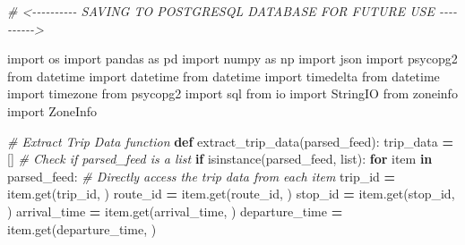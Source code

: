 \documentclass[
  12pt,
]{article}
\newenvironment{Shaded}{\begin{snugshade}}{\end{snugshade}}
\newcommand{\BuiltInTok}[1]{#1}
\newcommand{\CommentTok}[1]{\textcolor[rgb]{0.56,0.35,0.01}{\textit{#1}}}
\newcommand{\ControlFlowTok}[1]{\textcolor[rgb]{0.13,0.29,0.53}{\textbf{#1}}}
\newcommand{\ImportTok}[1]{#1}
\newcommand{\KeywordTok}[1]{\textcolor[rgb]{0.13,0.29,0.53}{\textbf{#1}}}
\newcommand{\NormalTok}[1]{#1}
\newcommand{\OperatorTok}[1]{\textcolor[rgb]{0.81,0.36,0.00}{\textbf{#1}}}
\newcommand{\StringTok}[1]{\textcolor[rgb]{0.31,0.60,0.02}{#1}}
\begin{document}
\begin{Shaded}
\begin{Highlighting}[]
\CommentTok{\# \textless{}{-}{-}{-}{-}{-}{-}{-}{-}{-}{-} SAVING TO POSTGRESQL DATABASE FOR FUTURE USE {-}{-}{-}{-}{-}{-}{-}{-}{-}{-}\textgreater{}}

\ImportTok{import}\NormalTok{ os}
\ImportTok{import}\NormalTok{ pandas }\ImportTok{as}\NormalTok{ pd}
\ImportTok{import}\NormalTok{ numpy }\ImportTok{as}\NormalTok{ np}
\ImportTok{import}\NormalTok{ json}
\ImportTok{import}\NormalTok{ psycopg2}
\ImportTok{from}\NormalTok{ datetime }\ImportTok{import}\NormalTok{ datetime}
\ImportTok{from}\NormalTok{ datetime }\ImportTok{import}\NormalTok{ timedelta}
\ImportTok{from}\NormalTok{ datetime }\ImportTok{import}\NormalTok{ timezone}
\ImportTok{from}\NormalTok{ psycopg2 }\ImportTok{import}\NormalTok{ sql}
\ImportTok{from}\NormalTok{ io }\ImportTok{import}\NormalTok{ StringIO}
\ImportTok{from}\NormalTok{ zoneinfo }\ImportTok{import}\NormalTok{ ZoneInfo}

\CommentTok{\# Extract Trip Data function}
\KeywordTok{def}\NormalTok{ extract\_trip\_data(parsed\_feed):}
\NormalTok{    trip\_data }\OperatorTok{=}\NormalTok{ []}
    \CommentTok{\# Check if parsed\_feed is a list}
    \ControlFlowTok{if} \BuiltInTok{isinstance}\NormalTok{(parsed\_feed, }\BuiltInTok{list}\NormalTok{):}
        \ControlFlowTok{for}\NormalTok{ item }\KeywordTok{in}\NormalTok{ parsed\_feed:}
            \CommentTok{\# Directly access the trip data from each item}
\NormalTok{            trip\_id }\OperatorTok{=}\NormalTok{ item.get(}\StringTok{\textquotesingle{}trip\_id\textquotesingle{}}\NormalTok{, }\StringTok{\textquotesingle{}\textquotesingle{}}\NormalTok{)}
\NormalTok{            route\_id }\OperatorTok{=}\NormalTok{ item.get(}\StringTok{\textquotesingle{}route\_id\textquotesingle{}}\NormalTok{, }\StringTok{\textquotesingle{}\textquotesingle{}}\NormalTok{)}
\NormalTok{            stop\_id }\OperatorTok{=}\NormalTok{ item.get(}\StringTok{\textquotesingle{}stop\_id\textquotesingle{}}\NormalTok{, }\StringTok{\textquotesingle{}\textquotesingle{}}\NormalTok{)}
\NormalTok{            arrival\_time }\OperatorTok{=}\NormalTok{ item.get(}\StringTok{\textquotesingle{}arrival\_time\textquotesingle{}}\NormalTok{, }\StringTok{\textquotesingle{}\textquotesingle{}}\NormalTok{)}
\NormalTok{            departure\_time }\OperatorTok{=}\NormalTok{ item.get(}\StringTok{\textquotesingle{}departure\_time\textquotesingle{}}\NormalTok{, }\StringTok{\textquotesingle{}\textquotesingle{}}\NormalTok{)}
            

\end{Highlighting}
\end{Shaded}
\end{document}
